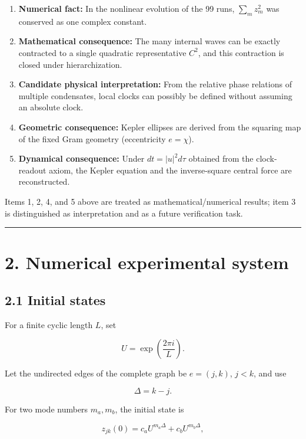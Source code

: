 \documentclass[
  a4paper,
]{article}
\providecommand{\tightlist}{%
  \setlength{\itemsep}{0pt}\setlength{\parskip}{0pt}}
\begin{document}
\begin{enumerate}
\def\labelenumi{\arabic{enumi}.}
\tightlist
\item
  \textbf{Numerical fact:} In the nonlinear evolution of the 99 runs,
  \(\sum_m z_m^2\) was conserved as one complex constant.
\item
  \textbf{Mathematical consequence:} The many internal waves can be
  exactly contracted to a single quadratic representative \(C^2\), and
  this contraction is closed under hierarchization.
\item
  \textbf{Candidate physical interpretation:} From the relative phase
  relations of multiple condensates, local clocks can possibly be
  defined without assuming an absolute clock.
\item
  \textbf{Geometric consequence:} Kepler ellipses are derived from the
  squaring map of the fixed Gram geometry (eccentricity \(e=\chi\)).
\item
  \textbf{Dynamical consequence:} Under \(dt=|u|^2d\tau\) obtained from
  the clock-readout axiom, the Kepler equation and the inverse-square
  central force are reconstructed.
\end{enumerate}

Items 1, 2, 4, and 5 above are treated as mathematical/numerical
results; item 3 is distinguished as interpretation and as a future
verification task.

\begin{center}\rule{0.5\linewidth}{0.5pt}\end{center}

\section{2. Numerical experimental
system}\label{numerical-experimental-system}

\subsection{2.1 Initial states}\label{initial-states}

For a finite cyclic length \(L\), set

\[
U=\exp\left(\frac{2\pi i}{L}\right).
\]

Let the undirected edges of the complete graph be \(e=(j,k)\), \(j<k\),
and use

\[
\Delta=k-j.
\]

For two mode numbers \(m_a,m_b\), the initial state is

\[
z_{jk}(0)
=
c_a U^{m_a\Delta}
+
c_b U^{m_b\Delta},
\]
\end{document}
